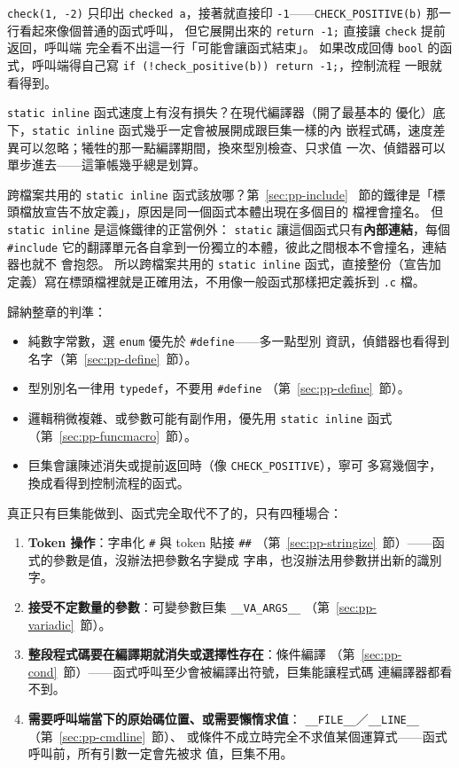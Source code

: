 
\texttt{check(1, -2)} 只印出 \texttt{checked a}，接著就直接印
\texttt{-1}——\texttt{CHECK\_POSITIVE(b)} 那一行看起來像個普通的函式呼叫，
但它展開出來的 \texttt{return -1;} 直接讓 \texttt{check} 提前返回，呼叫端
完全看不出這一行「可能會讓函式結束」。 如果改成回傳 \texttt{bool} 的函
式，呼叫端得自己寫 \texttt{if (!check\_positive(b)) return -1;}，控制流程
一眼就看得到。

\texttt{static inline} 函式速度上有沒有損失？在現代編譯器（開了最基本的
優化）底下，\texttt{static inline} 函式幾乎一定會被展開成跟巨集一樣的內
嵌程式碼，速度差異可以忽略；犧牲的那一點編譯期間，換來型別檢查、只求值
一次、偵錯器可以單步進去——這筆帳幾乎總是划算。

跨檔案共用的 \texttt{static inline} 函式該放哪？第~\ref{sec:pp-include}~
節的鐵律是「標頭檔放宣告不放定義」，原因是同一個函式本體出現在多個目的
檔裡會撞名。 但 \texttt{static inline} 是這條鐵律的正當例外：
\texttt{static} 讓這個函式只有\textbf{內部連結}，每個 \texttt{\#include}
它的翻譯單元各自拿到一份獨立的本體，彼此之間根本不會撞名，連結器也就不
會抱怨。 所以跨檔案共用的 \texttt{static inline} 函式，直接整份（宣告加
定義）寫在標頭檔裡就是正確用法，不用像一般函式那樣把定義拆到 \texttt{.c}
檔。

歸納整章的判準：

\begin{itemize}
\item 純數字常數，選 \texttt{enum} 優先於 \texttt{\#define}——多一點型別
資訊，偵錯器也看得到名字（第~\ref{sec:pp-define}~節）。
\item 型別別名一律用 \texttt{typedef}，不要用 \texttt{\#define}
（第~\ref{sec:pp-define}~節）。
\item 邏輯稍微複雜、或參數可能有副作用，優先用 \texttt{static inline}
函式（第~\ref{sec:pp-funcmacro}~節）。
\item 巨集會讓陳述消失或提前返回時（像 \texttt{CHECK\_POSITIVE}），寧可
多寫幾個字，換成看得到控制流程的函式。
\end{itemize}

真正只有巨集能做到、函式完全取代不了的，只有四種場合：

\begin{enumerate}
\item \textbf{Token 操作}：字串化 \texttt{\#} 與 token 貼接 \texttt{\#\#}
（第~\ref{sec:pp-stringize}~節）——函式的參數是值，沒辦法把參數名字變成
字串，也沒辦法用參數拼出新的識別字。
\item \textbf{接受不定數量的參數}：可變參數巨集 \texttt{\_\_VA\_ARGS\_\_}
（第~\ref{sec:pp-variadic}~節）。
\item \textbf{整段程式碼要在編譯期就消失或選擇性存在}：條件編譯
（第~\ref{sec:pp-cond}~節）——函式呼叫至少會被編譯出符號，巨集能讓程式碼
連編譯器都看不到。
\item \textbf{需要呼叫端當下的原始碼位置、或需要懶惰求值}：
\texttt{\_\_FILE\_\_}／\texttt{\_\_LINE\_\_}（第~\ref{sec:pp-cmdline}~節）、
或條件不成立時完全不求值某個運算式——函式呼叫前，所有引數一定會先被求
值，巨集不用。
\end{enumerate}

